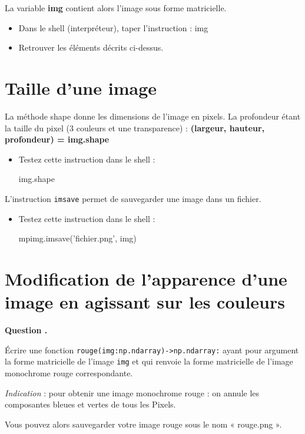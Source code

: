 \documentclass[10pt]{article}
\newcounter{cexo}
\newenvironment{qexo}{
\refstepcounter{cexo}
\vspace{3 pt}
\noindent
\begin{minipage}[t]{0.15\textwidth}
\textbf{\noindent Question \arabic{cexo}. }
\end{minipage}\noindent
\begin{minipage}[t]{0.85\textwidth}}{\vspace{3 pt}
\end{minipage}}%
\begin{document}
La variable \textbf{img} contient alors l'image sous forme matricielle.

\begin{itemize}
\item Dans le shell (interpréteur), taper l’instruction :  img
\item Retrouver les éléments décrits ci-dessus.
\end{itemize}

\section{Taille d'une image}
La méthode shape donne les dimensions de l'image en pixels. La profondeur étant la taille du pixel (3 couleurs et une transparence) : \textbf{(largeur, hauteur, profondeur) = img.shape}

\begin{itemize}

\item Testez cette instruction dans le shell :
\begin{python}
img.shape
\end{python}
\end{itemize}

L’instruction \texttt{imsave} permet de sauvegarder une image dans un fichier.
\begin{itemize}
\item Testez cette instruction dans le shell :
\begin{python}
mpimg.imsave('fichier.png', img)
\end{python}

\end{itemize}


\section{Modification de l'apparence d'une image en agissant sur les couleurs}

\begin{qexo}
\'Ecrire une fonction \texttt{rouge(img:np.ndarray)->np.ndarray:} ayant pour argument la forme matricielle de l'image \texttt{img} et qui renvoie la forme matricielle de l'image monochrome rouge correspondante.

\textit{Indication} : pour obtenir une image monochrome rouge : on annule les composantes bleues et vertes de tous les Pixels.

Vous pouvez alors sauvegarder votre image rouge sous le nom « rouge.png ».
\end{qexo}
\end{document}
